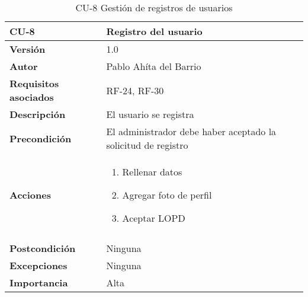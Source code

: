 \begin{table}[p]
	\centering
	\begin{tabularx}{\linewidth}{ p{} p{} }
		\toprule
		\textbf{CU-8}    & \textbf{Registro del usuario}\\
		\toprule
		\textbf{Versión}              & 1.0    \\
		\textbf{Autor}                & Pablo Ahíta del Barrio \\
		\textbf{Requisitos asociados} & RF-24, RF-30\\
		\textbf{Descripción}          & El usuario se registra\\
		\textbf{Precondición}         & El administrador debe haber aceptado la solicitud de registro\\
		\textbf{Acciones}             &
		\begin{enumerate}
			\def\labelenumi{\arabic{enumi}.}
			\tightlist
			\item Rellenar datos
			\item Agregar foto de perfil
			\item Aceptar LOPD
		\end{enumerate}\\
		\\
		\textbf{Postcondición}        & Ninguna \\
		\textbf{Excepciones}          & Ninguna \\
		\textbf{Importancia}          & Alta \\
		\bottomrule
	\end{tabularx}
	\caption{CU-8 Gestión de registros de usuarios}
\end{table}

